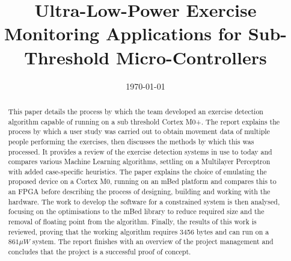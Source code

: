 \documentclass{.style/ecsgdp}         %
\begin{document}
	\frontmatter
	\title{Ultra-Low-Power Exercise Monitoring Applications for Sub-Threshold Micro-Controllers}
	\addresses  {\groupname\\\deptname\\\univname}
	\date       {\today}
	\subject    {}
	\keywords   {}
	\maketitle
	\begin{abstract}
		This paper details the process by which the team developed an exercise detection algorithm capable of running on a sub threshold Cortex M0+. The report explains the process by which a user study was carried out to obtain movement data of multiple people performing the exercises, then discusses the methods by which this was processed. It provides a review of the exercise detection systems in use to today and compares various Machine Learning algorithms, settling on a Multilayer Perceptron with added case-specific heuristics. The paper explains the choice of emulating the proposed device on a Cortex M0, running on an mBed platform and compares this to an FPGA before describing the process of designing, building and working with the hardware. The work to develop the software for a constrained system is then analysed, focusing on the optimisations to the mBed library to reduce required size and the removal of floating point from the algorithm. Finally, the results of this work is reviewed, proving that the working algorithm requires 3456 bytes and can run on a $861 \mu W$ system. The report finishes with an overview of the project management and concludes that the project is a successful proof of concept.
	\end{abstract}
\end{document}
